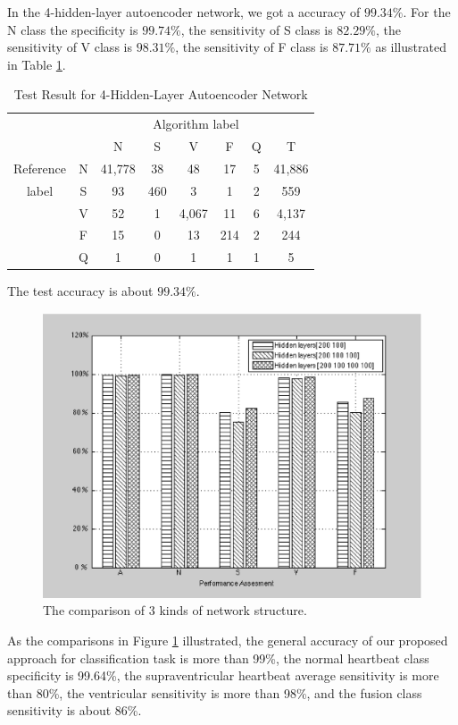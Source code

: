 \documentclass[journal]{IEEEtran}
\begin{document}
In the 4-hidden-layer autoencoder network, we got a accuracy of $99.34\%$. For the N class the specificity is $99.74\%$, the sensitivity of S class is $82.29\%$, the sensitivity of V class is $98.31\%$, the sensitivity of F class is $87.71\%$ as illustrated in Table \ref{table7}. 


\begin{table}[!htbp]
\begin{center}
\begin{threeparttable}
\caption{Test Result for 4-Hidden-Layer Autoencoder Network}
\label{table7}
\begin{tabular}{cccccccc}
\hline
\multicolumn{6}{r}{Algorithm label} \\
\cline{3-7}
&  & N & S & V & F & Q & T\\
\hline
 Reference & N & 41,778 &  38  &  48  & 17  & 5  &  41,886 \\
	label & S &  93   & 460  &   3  & 1   & 2  &  559\\
			   & V &  52   & 1    & 4,067 & 11  & 6  &  4,137\\
			   & F &  15   & 0    & 13   & 214 & 2  &  244\\
			  & Q &  1    & 0    & 1    & 1   & 1  &  5\\
\hline
\end{tabular}
\begin{tablenotes}
\item The test accuracy is about $99.34\%$.
\end{tablenotes}
\end{threeparttable}
\end{center}
\end{table}

\begin{figure}[]
\centering
\includegraphics[width=3.2 in]{Figure4}
\caption{The comparison of 3 kinds of network structure.}
\label{figure4}
\end{figure}
As the comparisons in Figure \ref{figure4} illustrated, the general accuracy of our proposed approach for classification task is more than 99\%, the normal heartbeat class specificity is 99.64\%, the supraventricular heartbeat average sensitivity is more than 80\%, the ventricular sensitivity is more than 98\%, and the fusion class sensitivity is about 86\%.
\end{document}
